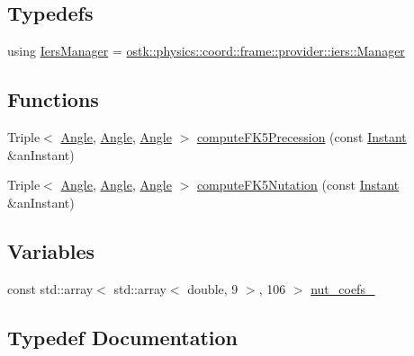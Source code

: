 \subsection*{Typedefs}
\begin{DoxyCompactItemize}
\item 
using \hyperlink{namespaceostk_1_1physics_1_1coord_1_1frame_1_1provider_a4a4183a2547e2e41d722a832c7e1c137}{Iers\+Manager} = \hyperlink{classostk_1_1physics_1_1coord_1_1frame_1_1provider_1_1iers_1_1_manager}{ostk\+::physics\+::coord\+::frame\+::provider\+::iers\+::\+Manager}
\end{DoxyCompactItemize}
\subsection*{Functions}
\begin{DoxyCompactItemize}
\item 
Triple$<$ \hyperlink{classostk_1_1physics_1_1units_1_1_angle}{Angle}, \hyperlink{classostk_1_1physics_1_1units_1_1_angle}{Angle}, \hyperlink{classostk_1_1physics_1_1units_1_1_angle}{Angle} $>$ \hyperlink{namespaceostk_1_1physics_1_1coord_1_1frame_1_1provider_acd9c9770d79be89d7c94517df77ebe27}{compute\+F\+K5\+Precession} (const \hyperlink{classostk_1_1physics_1_1time_1_1_instant}{Instant} \&an\+Instant)
\item 
Triple$<$ \hyperlink{classostk_1_1physics_1_1units_1_1_angle}{Angle}, \hyperlink{classostk_1_1physics_1_1units_1_1_angle}{Angle}, \hyperlink{classostk_1_1physics_1_1units_1_1_angle}{Angle} $>$ \hyperlink{namespaceostk_1_1physics_1_1coord_1_1frame_1_1provider_a0766714124629840ab0b3a909bc6e473}{compute\+F\+K5\+Nutation} (const \hyperlink{classostk_1_1physics_1_1time_1_1_instant}{Instant} \&an\+Instant)
\end{DoxyCompactItemize}
\subsection*{Variables}
\begin{DoxyCompactItemize}
\item 
const std\+::array$<$ std\+::array$<$ double, 9 $>$, 106 $>$ \hyperlink{namespaceostk_1_1physics_1_1coord_1_1frame_1_1provider_a73bcae3137799317545b837aa5693632}{nut\+\_\+coefs\+\_}
\end{DoxyCompactItemize}


\subsection{Typedef Documentation}
\mbox{\label{namespaceostk_1_1physics_1_1coord_1_1frame_1_1provider_a4a4183a2547e2e41d722a832c7e1c137}} 
